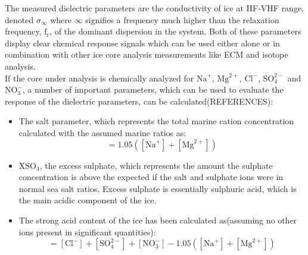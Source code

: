 \documentclass[../../CompleteThesis2/Complete_2ndDraft.tex]{subfiles}
\begin{document}
	The measured dielectric parameters are the conductivity of ice at HF-VHF range, denoted $\sigma_{\infty}$ where $\infty$ signifies a frequency much higher than the relaxation frequency, $\text{f}_{\text{r}}$, of the dominant dispersion in the system. Both of these parameters display clear chemical response signals which can be used either alone or in combination with other ice core analysis measurements like ECM and isotope analysis.\\
	If the core under analysis is chemically analyzed for $\text{Na}^+$, $\text{Mg}^{2+}$, $\text{Cl}^-$, $\text{SO}_4^{2-}$ and $\text{NO}_3^-$, a number of important parameters, which can be used to evaluate the response of the dielectric parameters, can be calculated(REFERENCES):
	\begin{itemize}
		\item The salt parameter, which represents the total marine cation concentration calculated with the assumed marine ratios as:
		\begin{equation}
			[\text{salt}] = 1.05 ([\text{Na}^+] + [\text{Mg}^{2+}])
		\end{equation}
		\item $\text{XSO}_4$, the excess sulphate, which represents the amount the sulphate concentration is above the expected if the salt and sulphate ions were in normal sea salt ratios. Excess sulphate is essentially sulphuric acid, which is the main acidic component of the ice.
		\item The strong acid content of the ice has been calculated as(assuming no other ions present in significant quantities):
		\begin{equation}
			[\text{acid}] = [\text{Cl}^-] + [\text{SO}_4^{2-}] + [\text{NO}_3^-] - 1.05 ([\text{Na}^+] + [\text{Mg}^{2+}])
		\end{equation}
	\end{itemize}
	
\end{document}
